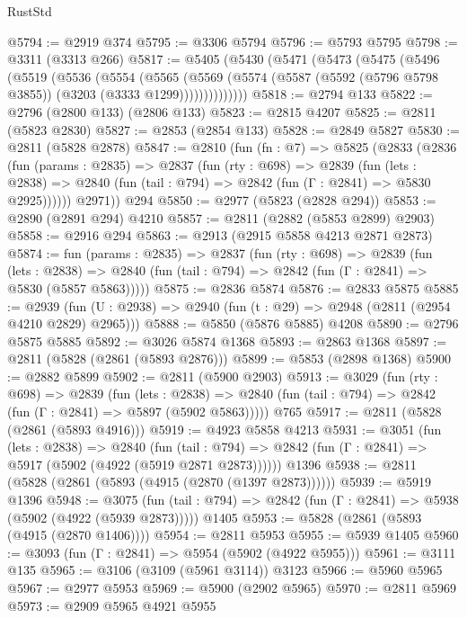 \begin{lexlean}{RustStd}
\begin{coremodule}
{\begin{coremodule}
{{{{{{{{{{{{{{{@5794 := @2919 @374
@5795 := @3306 @5794
@5796 := @5793 @5795
@5798 := @3311 (@3313 @266)
@5817 := @5405
    (@5430
      (@5471
        (@5473
          (@5475
            (@5496
              (@5519
                (@5536
                  (@5554
                    (@5565
                      (@5569
                        (@5574 (@5587 (@5592 (@5796 @5798 @3855)) (@3203 (@3333 @1299))))))))))))))
@5818 := @2794 @133
@5822 := @2796 (@2800 @133) (@2806 @133)
@5823 := @2815 @4207
@5825 := @2811 (@5823 @2830)
@5827 := @2853 (@2854 @133)
@5828 := @2849 @5827
@5830 := @2811 (@5828 @2878)
@5847 := @2810
    (fun (fn : @7) =>
    @5825
      (@2833
        (@2836
          (fun (params : @2835) =>
          @2837
            (fun (rty : @698) =>
            @2839
              (fun (lets : @2838) =>
              @2840 (fun (tail : @794) => @2842 (fun (Γ : @2841) => @5830 @2925))))))
        @2971))
    @294
@5850 := @2977 (@5823 (@2828 @294))
@5853 := @2890 (@2891 @294) @4210
@5857 := @2811 (@2882 (@5853 @2899) @2903)
@5858 := @2916 @294
@5863 := @2913 (@2915 @5858 @4213 @2871 @2873)
@5874 := fun (params : @2835) =>
  @2837
    (fun (rty : @698) =>
    @2839
      (fun (lets : @2838) =>
      @2840 (fun (tail : @794) => @2842 (fun (Γ : @2841) => @5830 (@5857 @5863)))))
@5875 := @2836 @5874
@5876 := @2833 @5875
@5885 := @2939 (fun (U : @2938) => @2940 (fun (t : @29) => @2948 (@2811 (@2954 @4210 @2829) @2965)))
@5888 := @5850 (@5876 @5885) @4208
@5890 := @2796 @5875 @5885
@5892 := @3026 @5874 @1368
@5893 := @2863 @1368
@5897 := @2811 (@5828 (@2861 (@5893 @2876)))
@5899 := @5853 (@2898 @1368)
@5900 := @2882 @5899
@5902 := @2811 (@5900 @2903)
@5913 := @3029
    (fun (rty : @698) =>
    @2839
      (fun (lets : @2838) =>
      @2840 (fun (tail : @794) => @2842 (fun (Γ : @2841) => @5897 (@5902 @5863)))))
    @765
@5917 := @2811 (@5828 (@2861 (@5893 @4916)))
@5919 := @4923 @5858 @4213
@5931 := @3051
    (fun (lets : @2838) =>
    @2840
      (fun (tail : @794) => @2842 (fun (Γ : @2841) => @5917 (@5902 (@4922 (@5919 @2871 @2873))))))
    @1396
@5938 := @2811 (@5828 (@2861 (@5893 (@4915 (@2870 (@1397 @2873))))))
@5939 := @5919 @1396
@5948 := @3075
    (fun (tail : @794) => @2842 (fun (Γ : @2841) => @5938 (@5902 (@4922 (@5939 @2873)))))
    @1405
@5953 := @5828 (@2861 (@5893 (@4915 (@2870 @1406))))
@5954 := @2811 @5953
@5955 := @5939 @1405
@5960 := @3093 (fun (Γ : @2841) => @5954 (@5902 (@4922 @5955)))
@5961 := @3111 @135
@5965 := @3106 (@3109 (@5961 @3114)) @3123
@5966 := @5960 @5965
@5967 := @2977 @5953
@5969 := @5900 (@2902 @5965)
@5970 := @2811 @5969
@5973 := @2909 @5965 @4921 @5955
}}}}}}}}}}}}}}}
\end{coremodule}}
\end{coremodule}
\end{lexlean}
